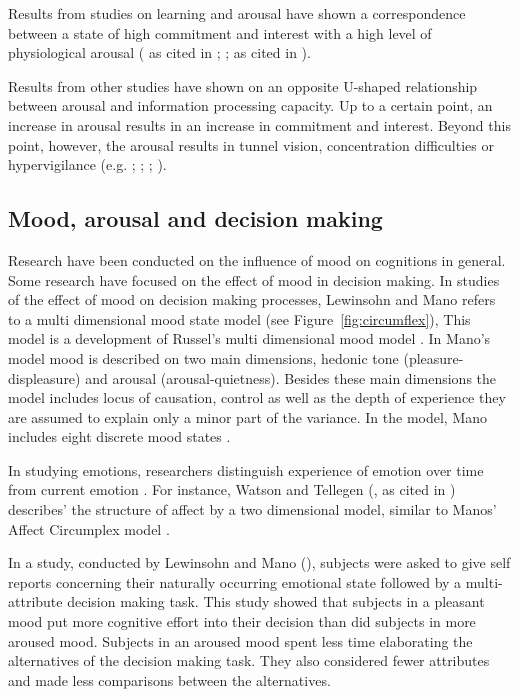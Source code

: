 \documentclass[jou,draftfirst,11pt]{apa6}
\newcommand{\figur}[1]{Figure~\ref{#1}}
\begin{document}
Results from studies on learning and arousal have shown a
correspondence between a state of high commitment and interest with a
high level of physiological arousal (\cite{Berlyne60} as cited in
\cite{Izard77}; \cite{Berlyne67}; as cited in \cite{Izard77}).

Results from other studies have shown on an opposite U-shaped
relationship between arousal and information processing capacity.  Up
to a certain point, an increase in arousal results in an increase in
commitment and interest.  Beyond this point, however, the arousal
results in tunnel vision, concentration difficulties or hypervigilance
(e.g. \cite{Easterbrook59}; \cite{JanisMann77}; \cite{LewinsohnMano93};
\cite{StoneKadous94}).



\subsection{Mood, arousal and decision making}

Research have been conducted on the influence of mood on cognitions in
general.  Some research have focused on the effect of mood in decision
making.  In studies of the effect of mood on decision making
processes, Lewinsohn and Mano refers to a multi dimensional mood state
model \parencite{LewinsohnMano93, Mano94} (see
\figur{fig:circumflex}), This model 
is a development of Russel's multi dimensional mood model
\parencite{Russel78}. In Mano's model mood is described on two main dimensions,
hedonic tone (pleasure-displeasure) and arousal (arousal-quietness).
Besides these main dimensions the model includes locus of causation,
control as well as the depth of experience they are assumed to explain
only a minor part of the variance.  In the model, Mano includes eight
discrete mood states \parencite{Mano94}.







In studying emotions, researchers distinguish experience of emotion
over time from current emotion \parencite{FiskeTaylor91}. For instance,
Watson and Tellegen (\cite{WatsonTellegen85}, as cited in \cite{FiskeTaylor91})
describes' the structure of affect by a two dimensional model, similar
to Manos' Affect Circumplex model \parencite{Mano94}.

In a study, conducted by Lewinsohn and Mano
(\citeyear{LewinsohnMano93}), subjects were asked to give self reports
concerning their naturally occurring emotional state followed by a
multi-attribute decision making task. This study showed that subjects
in a pleasant mood put more cognitive effort into their decision than
did subjects in more aroused mood. Subjects in an aroused mood spent
less time elaborating the alternatives of the decision making task.
They also considered fewer attributes and made less comparisons
between the alternatives.
\end{document}
